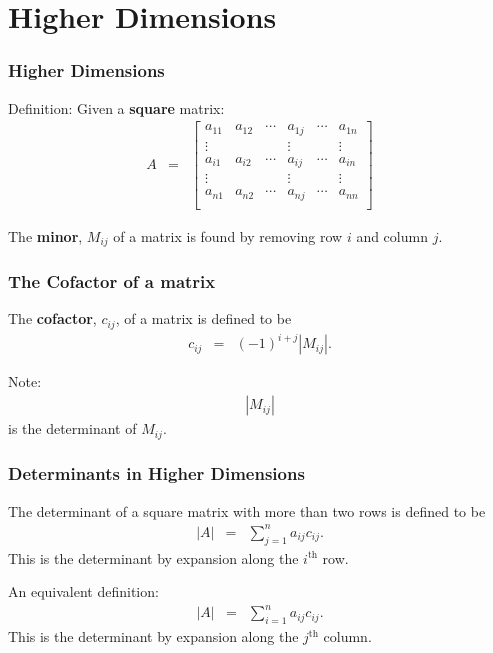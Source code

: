 \section{Higher Dimensions}

\begin{frame}
  \frametitle{Higher Dimensions}

  Definition: Given a \textbf{square} matrix:
  \begin{eqnarray*}
    A & = & 
    \left[
      \begin{array}{rrr|r|rr}
        a_{11} & a_{12} & \cdots & a_{1j} & \cdots & a_{1n} \\
        \vdots &       &        & \vdots &        & \vdots \\ \hline
        a_{i1} & a_{i2} & \cdots & a_{ij} & \cdots & a_{in} \\ \hline
        \vdots &       &        & \vdots &        & \vdots \\
        a_{n1} & a_{n2} & \cdots & a_{nj} & \cdots & a_{nn} \\
      \end{array}
    \right]
  \end{eqnarray*}

  The \textbf{minor}, $M_{ij}$ of a matrix is found by removing row
  $i$ and column $j$.

\end{frame}


\begin{frame}
  \frametitle{The Cofactor of a matrix}

  The \textbf{cofactor}, $c_{ij}$, of a matrix is defined to be 
  \begin{eqnarray*}
    c_{ij} & = & (-1)^{i+j}\left| M_{ij} \right|.
  \end{eqnarray*}

  Note:
  \begin{eqnarray*}
    \left| M_{ij} \right|
  \end{eqnarray*}
  is the determinant of $M_{ij}$.

\end{frame}


\begin{frame}
  \frametitle{Determinants in Higher Dimensions}

  The determinant of a square matrix with more than two rows is
  defined to be
  \begin{eqnarray*}
    \left| A \right| & = & \sum^n_{j=1} a_{ij} c_{ij}.
  \end{eqnarray*}
  This is the determinant by expansion along the $i^{\mathrm{th}}$
  row.

  An equivalent definition:
  \begin{eqnarray*}
    \left| A \right| & = & \sum^n_{i=1} a_{ij} c_{ij}.
  \end{eqnarray*}
  This is the determinant by expansion along the $j^{\mathrm{th}}$
  column.

  

\end{frame}


